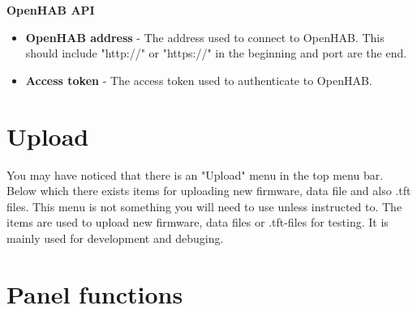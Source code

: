 \documentclass[10pt]{article}
\begin{document}
    \textbf{OpenHAB API}
    \begin{itemize}
      \item \textbf{OpenHAB address} - The address used to connect to OpenHAB. This should include "http://" or "https://" in the beginning and port are the end.
      \item \textbf{Access token} - The access token used to authenticate to OpenHAB.
    \end{itemize}

    \section{Upload}
    You may have noticed that there is an "Upload" menu in the top menu bar. Below which there exists items for uploading new firmware, data file and also .tft files. This menu is not something you
    will need to use unless instructed to. The items are used to upload new firmware, data files or .tft-files for testing. It is mainly used for development and debuging.

    \clearpage
    \section{Panel functions}
\end{document}
